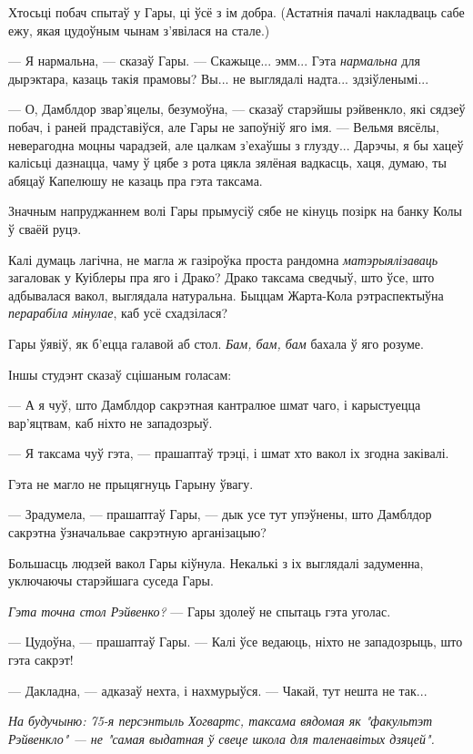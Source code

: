 Хтосьці побач спытаў у Гары, ці ўсё з ім добра. (Астатнія пачалі накладваць сабе ежу, якая
цудоўным чынам з'явілася на стале.)

--- Я нармальна, --- сказаў Гары. --- Скажыце... эмм... Гэта \emph{нармальна} для
дырэктара, казаць такія прамовы? Вы...  не выглядалі надта... здзіўленымі...

--- О, Дамблдор звар'яцелы, безумоўна, --- сказаў старэйшы рэйвенкло, які сядзеў побач,
і раней прадставіўся, але Гары не запоўніў яго імя. --- Вельмя вясёлы, неверагодна 
моцны чарадзей, але цалкам з'ехаўшы з глузду... Дарэчы, я бы хацеў калісьці дазнацца,
чаму ў цябе з рота цякла зялёная вадкасць, хаця, думаю, ты  абяцаў Капелюшу
не казаць пра гэта таксама.

Значным напруджаннем волі Гары прымусіў сябе не кінуць позірк на банку Колы ў
сваёй руцэ.

Калі думаць лагічна, не магла ж газіроўка проста рандомна  \emph{матэрыялізаваць}
загаловак у Куіблеры  пра яго і Драко? Драко таксама сведчыў, што ўсе, што адбывалася
вакол, выглядала натуральна. Быццам Жарта-Кола рэтраспектыўна 
\emph{перарабіла мінулае}, каб усё схадзілася?

Гары ўявіў, як б'ецца галавой аб стол.  \emph{Бам, бам, бам} бахала ў яго розуме.

Іншы студэнт сказаў сцішаным голасам:

--- А я чуў, што Дамблдор сакрэтная кантралюе шмат чаго, і карыстуецца вар'яцтвам, каб 
ніхто не западозрыў.

--- Я таксама чуў гэта, --- прашаптаў трэці, і шмат хто вакол іх згодна заківалі.

Гэта не магло не прыцягнуць Гарыну ўвагу.

--- Зрадумела, --- прашаптаў Гары, --- дык усе тут упэўнены, што Дамблдор сакрэтна 
ўзначальвае сакрэтную арганізацыю?

Большасць людзей вакол Гары кіўнула. Некалькі з іх выглядалі задуменна, уключаючы
старэйшага суседа Гары.

\emph{Гэта точна стол Рэйвенко?} --- Гары здолеў не спытаць гэта уголас.

--- Цудоўна, --- прашаптаў Гары. --- Калі ўсе ведаюць, ніхто не западозрыць, што 
гэта сакрэт!

--- Дакладна, --- адказаў нехта, і нахмурыўся. --- Чакай, тут нешта не так...

\emph{На будучыню: 75-я персэнтыль Хогвартс, таксама вядомая як "факультэт Рэйвенкло"
--- не "самая выдатная ў свеце школа для таленавітых дзяцей".}

